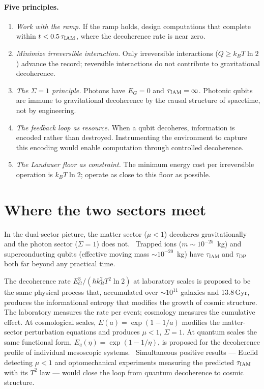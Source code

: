 \paragraph{Five principles.} \interp
\begin{enumerate}
\item \emph{Work with the ramp.} If the ramp holds, design computations that complete within $t<0.5\,\tau_{\rm IAM}$, where the decoherence rate is near zero.
\conjecture
\item \emph{Minimize irreversible interaction.} Only irreversible interactions ($Q\ge k_BT\ln2$) advance the record; reversible interactions do not contribute
to gravitational decoherence.
\item \emph{The $\Sigma=1$ principle.} Photons have $E_G=0$ and $\tau_{\rm IAM}=\infty$. Photonic qubits are immune to gravitational decoherence by the causal
structure of spacetime, not by engineering.
\item \emph{The feedback loop as resource.} When a qubit decoheres, information is encoded rather than destroyed. Instrumenting the environment to capture
this encoding would enable computation through controlled decoherence. \conjecture
\item \emph{The Landauer floor as constraint.} The minimum energy cost per irreversible operation is $k_BT\ln2$; operate as close to this floor as possible.
\end{enumerate}

\section{Where the two sectors meet}\label{sec:gd_sectors}
In the dual-sector picture, the matter sector ($\mu<1$) decoheres gravitationally and the photon sector ($\Sigma=1$) does not. \conjecture\ Trapped ions
($m\sim10^{-25}$~kg) and superconducting qubits (effective moving mass $\sim10^{-20}$~kg) have $\tau_{\mathrm{IAM}}$ and $\tau_{\mathrm{DP}}$ both far beyond
any practical time.

The decoherence rate $E_G^3/(\hbar k_B^2T^2\ln2)$ at laboratory scales is proposed to be the same physical process that, accumulated over $\sim10^{11}$
galaxies and 13.8\,Gyr, produces the informational entropy that modifies the growth of cosmic structure. The laboratory measures the rate per event;
cosmology measures the cumulative effect. At cosmological scales, $E(a)=\exp(1-1/a)$ modifies the matter-sector perturbation equations and produces $\mu<1$,
$\Sigma=1$. At quantum scales the same functional form, $E_q(\eta)=\exp(1-1/\eta)$, is proposed for the decoherence profile of individual mesoscopic
systems. \conjecture\ Simultaneous positive results --- Euclid detecting $\mu<1$ and optomechanical experiments measuring the predicted $\tau_{\rm IAM}$ with
its $T^2$ law --- would close the loop from quantum decoherence to cosmic structure.

